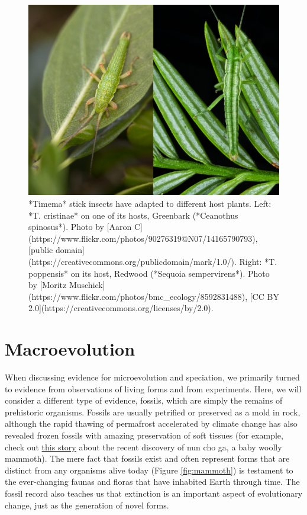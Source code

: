 \documentclass[
]{book}
\begin{document}
\begin{figure}
\includegraphics[width=1\linewidth]{images/timema} \caption{*Timema* stick insects have adapted to different host plants. Left: *T. cristinae* on one of its hosts, Greenbark (*Ceanothus spinosus*). Photo by [Aaron C](https://www.flickr.com/photos/90276319@N07/14165790793), [public domain](https://creativecommons.org/publicdomain/mark/1.0/). Right: *T. poppensis* on its host, Redwood (*Sequoia sempervirens*). Photo by [Moritz Muschick](https://www.flickr.com/photos/bmc_ecology/8592831488), [CC BY 2.0](https://creativecommons.org/licenses/by/2.0).}\label{fig:timema}
\end{figure}

\hypertarget{macroevolution}{%
\section{Macroevolution}\label{macroevolution}}

When discussing evidence for microevolution and speciation, we primarily turned to evidence from observations of living forms and from experiments. Here, we will consider a different type of evidence, fossils, which are simply the remains of prehistoric organisms. Fossils are usually petrified or preserved as a mold in rock, although the rapid thawing of permafrost accelerated by climate change has also revealed frozen fossils with amazing preservation of soft tissues (for example, check out \href{https://www.smithsonianmag.com/history/well-preserved-30000-year-old-baby-woolly-mammoth-emerges-from-yukon-permafrost-180980388/}{this story} about the recent discovery of nun cho ga, a baby woolly mammoth). The mere fact that fossils exist and often represent forms that are distinct from any organisms alive today (Figure \ref{fig:mammoth}) is testament to the ever-changing faunas and floras that have inhabited Earth through time. The fossil record also teaches us that extinction is an important aspect of evolutionary change, just as the generation of novel forms.
\end{document}

